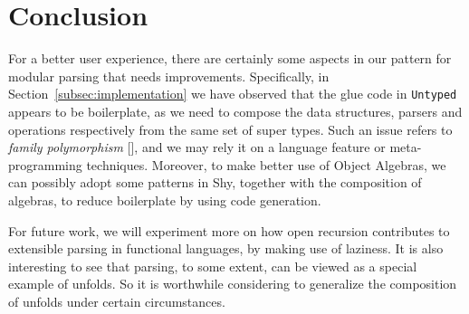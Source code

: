 \section{Conclusion}\label{sec:conclusion}


For a better user experience, there are certainly some aspects in our pattern for modular parsing that needs
improvements. Specifically, in Section~\ref{subsec:implementation} we have observed that the glue code in \lstinline{Untyped}
appears to be boilerplate, as we need to compose the data structures, parsers and operations respectively from the same set of super types. Such an issue refers to \textit{family polymorphism} [], and we may rely it on a language feature or meta-programming techniques. Moreover, to make better use of Object Algebras, we can possibly adopt some patterns in Shy, together with the composition of algebras, to reduce boilerplate by using code generation.

For future work, we will experiment more on how open recursion contributes to extensible parsing in functional languages, by making use of laziness. It is also interesting to see that parsing, to some extent, can be viewed as a special example of unfolds. So it is worthwhile considering to generalize the composition of unfolds under certain circumstances.